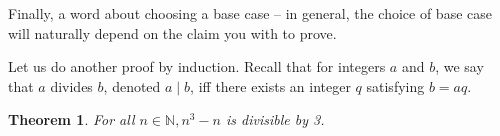 \documentclass[12pt,a4paper]{article}
\newtheorem{theorem}{Theorem}[section]
\theoremstyle{definition}
\begin{document}
\bigbreak

Finally, a word about choosing a base case -- in general, the choice of base case will naturally depend on the claim you with to prove.

\bigbreak

Let us do another proof by induction. Recall that for integers $a$ and $b$, we say that $a$ divides $b$, denoted $a\mid b$, iff there exists an integer $q$ satisfying $b=aq$.

\begin{theorem}
For all $n\in\mathbb{N}, n^3-n$ is divisible by 3.
\end{theorem}
\end{document}
